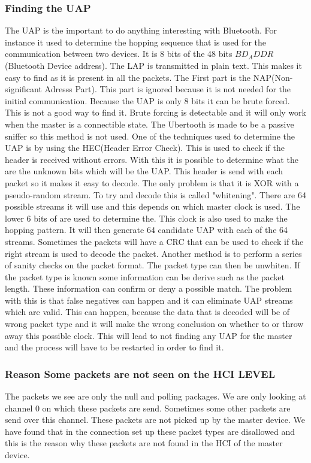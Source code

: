 \subsubsection{Finding the UAP}
\label{subsubsec:finding_uap}
The UAP is the important to do anything interesting with Bluetooth. For instance it used to determine the hopping sequence that is used for the communication between two devices. It is 8 bits of the 48 bits $BD_ADDR$ (Bluetooth Device address). The LAP is transmitted in plain text. This makes it easy to find as it is present in all the packets. The First part is the NAP(Non-significant Adresss Part). This part is ignored because it is not needed for the initial communication. Because the UAP is only 8 bits it can be brute forced. This is not a good way to find it. Brute forcing is detectable and it will only work when the master is a connectible state. \pend
The Ubertooth is made to be a passive sniffer so this method is not used. One of the techniques used to determine the UAP is by using the HEC(Header Error Check). This is used to check if the header is received without errors. With this it is possible to determine what the are the unknown bits which will be the UAP. This header is send with each packet so it makes it easy to decode. The only problem is that it is XOR with a pseudo-random stream. To try and decode this is called "whitening". There are 64 possible streams it will use and this depends on which master clock is used. The lower 6 bits of are used to determine the. This clock is also used to make the hopping pattern. It will then generate 64 candidate UAP with each of the 64 streams. Sometimes the packets will have a CRC that can be used to check if the right stream is used to decode the packet. \pend
Another method is to perform a series of sanity checks on the packet format. The packet type can then be unwhiten. If the packet type is known some information can be derive such as the packet length. These information can confirm or deny a possible match. The problem with this is that false negatives can happen and it can eliminate UAP streams which are valid. This can happen, because the data that is decoded will be of wrong packet type and it will make the wrong conclusion on whether to or throw away this possible clock. This will lead to not finding any UAP for the master and the process will have to be restarted in order to find it. \pend

\subsubsection{Reason Some packets are not seen on the HCI LEVEL}
The packets we see are only  the null and polling packages. We are only looking at channel 0  on which these packets are send. Sometimes some other packets are send over this channel. These packets are not picked up by the master device. We have found that in the connection set up these packet types are disallowed and this is the reason why these packets are not found in the HCI of the master device.
